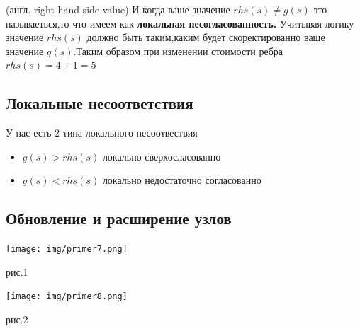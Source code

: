 \documentclass[12pt]{article}
\begin{document}
(англ. right-hand side value) И когда ваше значение $rhs(s)\neq g(s)$ это называеться,то что имеем как \textbf{локальная несогласованность.}
Учитывая логику значение $rhs(s)$ должно быть таким,каким будет скоректированно ваше значение $g(s)$.Таким образом при изменении стоимости ребра $rhs(s)=4+1=5$
\subsection*{Локальные несоответствия}
У нас есть 2 типа локального несоотвествия
\begin{itemize}
    \item $g(s)>rhs(s)$ локально сверхосласованно
    \item $g(s)<rhs(s)$ локально недостаточно согласованно
\end{itemize}
\subsection*{Обновление и расширение узлов}
\begin{center}
        \texttt{[image: img/primer7.png]}
        \caption{рис.1}
        \texttt{[image: img/primer8.png]}
        \caption{рис.2}
\end{center}
\end{document}
